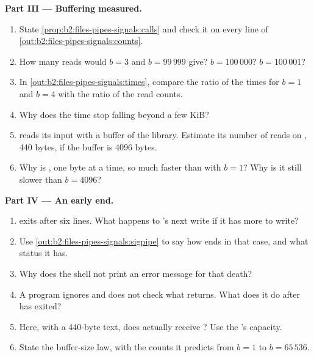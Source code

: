 \begin{problem}
\medskip\noindent\textbf{Part III --- Buffering measured.}\par\nopagebreak
\begin{enumerate}[resume, beginpenalty=10000]
\item State \cref{prop:b2:files-pipes-signals:calls} and check it on every line of
\cref{out:b2:files-pipes-signals:counts}.
\item How many reads would $b = 3$ and $b = 99\,999$ give? $b = 100\,000$? $b = 100\,001$?
\item In \cref{out:b2:files-pipes-signals:times}, compare the ratio of the times for $b = 1$ and $b = 4$ with the
ratio of the read counts.
\item Why does the time stop falling beyond a few KiB?
\item {} reads its input with a buffer of the library. Estimate its number of reads on , 440
bytes, if the buffer is 4096 bytes.
\item Why is , one byte at a time, so much faster than  with $b = 1$? Why is it still slower
than $b = 4096$?
\end{enumerate}

\medskip\noindent\textbf{Part IV --- An early end.}\par\nopagebreak
\begin{enumerate}[resume, beginpenalty=10000]
\item {} exits after six lines. What happens to 's next write if it has more to write?
\item Use \cref{out:b2:files-pipes-signals:sigpipe} to say how  ends in that case, and what status it has.
\item Why does the shell not print an error message for that death?
\item A program ignores  and does not check what  returns. What does it do after
 has exited?
\item Here, with a 440-byte text, does  actually receive ? Use the 's capacity.
\item State the buffer-size law, with the counts it predicts from $b = 1$ to $b = 65\,536$.
\end{enumerate}
\end{problem}
